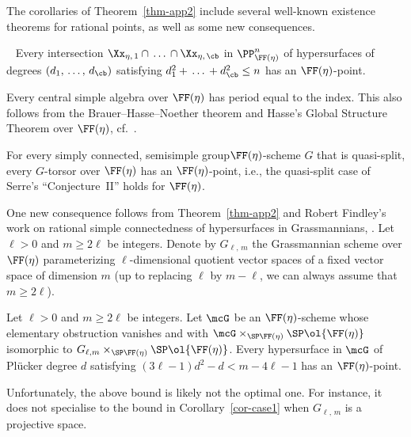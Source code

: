 The corollaries of Theorem~\ref{thm-app2} include several well-known existence theorems for rational points, as well as some new consequences.

\begin{coro}~\cite[Corollary, p.~378]{Lang52}\label{cor-case1}
Every intersection $\Xx_{\eta,\,1}\cap\,\dots\, \cap \Xx_{\eta,\,\cb}$ in $\PP^n_{\FF(\eta)}$ of hypersurfaces of degrees $(d_1,\,\dots,\,d_\cb)$ satisfying $d_1^2 +\,\dots\,+ d_\cb^2\leq n$ has an $\FF(\eta)$-point.
\end{coro}

\begin{coro} \label{cor-case2}
Every central simple algebra over $\FF(\eta)$ has period equal to the index. This also follows from the Brauer--Hasse--Noether theorem and Hasse's Global Structure Theorem over $\FF(\eta)$, cf.~\cite[pp.~40--41]{Roquette}.
\end{coro}

\begin{coro}\cite{Harder} \label{cor-case3}
For every simply connected, semisimple group\linebreak$\FF(\eta)$-scheme $G$ that is quasi-split, every $G$-torsor over $\FF(\eta)$ has an $\FF(\eta)$-point, i.e., the quasi-split case of Serre's ``Conjecture~II'' holds for $\FF(\eta)$.
\end{coro}

One new consequence follows from Theorem~\ref{thm-app2} and Robert Findley's work on rational simple connectedness of hypersurfaces in Grassmannians, \cite[Theorem~1.8]{Findley}. Let $\ell>0$ and $m\geq 2\ell$ be integers. Denote by $G_{\ell,\,m}$ the Grassmannian scheme over $\FF(\eta)$ parameterizing $\ell$-dimensional quotient vector spaces of a fixed vector space of dimension $m$ (up to replacing $\ell$ by $m-\ell$, we can always assume that $m\geq 2\ell$).

\begin{coro}\label{cor-case4}
Let $\ell>0$ and $m\geq 2\ell$ be integers. Let $\mcG$ be an $\FF(\eta)$-scheme whose elementary obstruction vanishes and with $\mcG\times_{\SP \FF(\eta)} \SP \ol{\FF(\eta)}$ isomorphic to $G_{\ell,m}\times_{\SP \FF(\eta)} \SP \ol{\FF(\eta)}$. Every hypersurface in $\mcG$ of Pl\"ucker degree $d$ satisfying $(3\ell-1)d^2 - d < m-4\ell-1$ has an $\FF(\eta)$-point.
\end{coro}

Unfortunately, the above bound is likely not the optimal one. For instance, it does not specialise to the bound in Corollary~\ref{cor-case1} when $G_{\ell,\,m}$ is a projective space.




